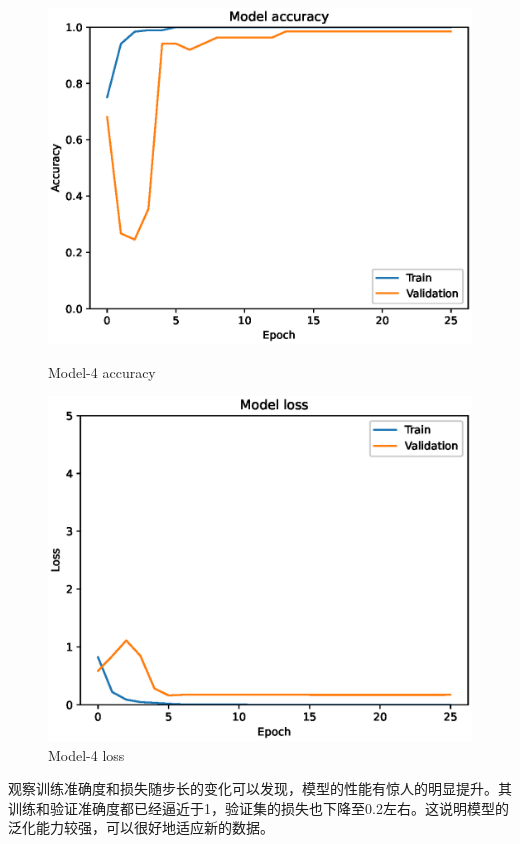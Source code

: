 \begin{figure}
    \centering
    \begin{minipage}{0.45\textwidth}
        \centering
        \includegraphics[width=\textwidth]{./fig/model4/accuracy4.eps}
        \caption{Model-4 accuracy}
        \label{fig:model4_accuracy}
    \end{minipage}
    \begin{minipage}{0.45\textwidth}
        \centering
        \includegraphics[width=\textwidth]{./fig/model4/loss4.eps}
        \caption{Model-4 loss}
        \label{fig:model4_loss}
    \end{minipage}
\end{figure}

观察训练准确度和损失随步长的变化可以发现，模型的性能有惊人的明显提升。其训练和验证准确度都已经逼近于1，验证集的损失也下降至0.2左右。这说明模型的泛化能力较强，可以很好地适应新的数据。






